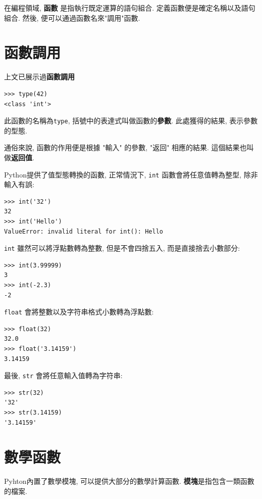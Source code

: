 \documentclass[10pt]{book}
\begin{document}
在編程領域, {\bf 函數} 是指執行既定運算的語句組合. 
定義函數便是確定名稱以及語句組合. 然後, 便可以通過函數名來"調用"函數. 

\section{函數調用}
\label{functionchap}

上文已展示過{\bf 函數調用}

\begin{verbatim}
>>> type(42)
<class 'int'>
\end{verbatim}
%
此函數的名稱為{\tt type},  括號中的表達式叫做函數的{\bf 參數}. 
此處獲得的結果, 表示參數的型態. 

通俗來說, 函數的作用便是根據 "輸入" 的參數, "返回" 相應的結果. 
這個結果也叫做{\bf 返回值}. 

Python提供了值型態轉換的函數, 正常情況下, {\tt int} 函數會將任意值轉為整型, 
除非輸入有誤:

\begin{verbatim}
>>> int('32')
32
>>> int('Hello')
ValueError: invalid literal for int(): Hello
\end{verbatim}
%
{\tt int} 雖然可以將浮點數轉為整數, 但是不會四捨五入, 而是直接捨去小數部分:

\begin{verbatim}
>>> int(3.99999)
3
>>> int(-2.3)
-2
\end{verbatim}
%
{\tt float} 會將整數以及字符串格式小數轉為浮點數:

\begin{verbatim}
>>> float(32)
32.0
>>> float('3.14159')
3.14159
\end{verbatim}
%
最後, {\tt str} 會將任意輸入值轉為字符串:

\begin{verbatim}
>>> str(32)
'32'
>>> str(3.14159)
'3.14159'
\end{verbatim}
%

\section{數學函數}

Pyhton內置了數學模塊, 可以提供大部分的數學計算函數. 
{\bf 模塊}是指包含一類函數的檔案. 
\end{document}
